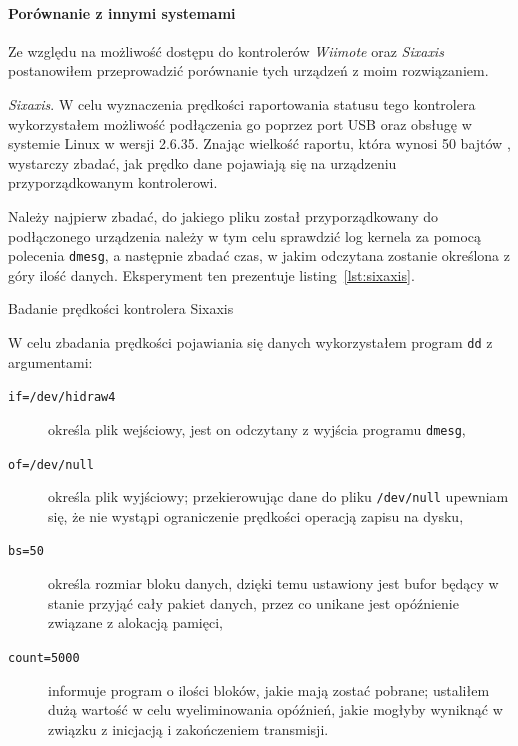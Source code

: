 \paragraph{Porównanie z innymi systemami}
Ze względu na możliwość dostępu do kontrolerów \textsl{Wiimote} oraz \textsl{Sixaxis} postanowiłem przeprowadzić porównanie tych urządzeń z moim rozwiązaniem.
\newline

\textsl{Sixaxis}. W celu wyznaczenia prędkości raportowania statusu tego kontrolera wykorzystałem możliwość podłączenia go poprzez port USB oraz obsługę w systemie Linux w wersji 2.6.35. Znając wielkość raportu, która wynosi 50 bajtów \citep{Br10}, wystarczy zbadać, jak prędko dane pojawiają się na urządzeniu przyporządkowanym kontrolerowi. 

Należy najpierw zbadać, do jakiego pliku został przyporządkowany do podłączonego urządzenia \ppauza należy w tym celu sprawdzić log kernela za pomocą polecenia \texttt{dmesg}, a następnie zbadać czas, w jakim odczytana zostanie określona z góry ilość danych. Eksperyment ten prezentuje listing~\ref{lst:sixaxis}.

\begin{listing}
  
  \caption{Badanie prędkości kontrolera Sixaxis}
  \label{lst:sixaxis}
\end{listing}

W celu zbadania prędkości pojawiania się danych wykorzystałem program \texttt{dd} z argumentami:
\begin{description}
 \item[\texttt{if=/dev/hidraw4}] określa plik wejściowy, jest on odczytany z wyjścia programu \texttt{dmesg},
 \item[\texttt{of=/dev/null}] określa plik wyjściowy; przekierowując dane do pliku \texttt{/dev/null} upewniam się, że nie wystąpi ograniczenie prędkości operacją zapisu na dysku,
 \item[\texttt{bs=50}] określa rozmiar bloku danych, dzięki temu ustawiony jest bufor będący w stanie przyjąć cały pakiet danych, przez co unikane jest opóźnienie związane z alokacją pamięci,
 \item[\texttt{count=5000}] informuje program o ilości bloków, jakie mają zostać pobrane; ustaliłem dużą wartość w celu wyeliminowania opóźnień, jakie mogłyby wyniknąć w związku z inicjacją i zakończeniem transmisji.
\end{description}

